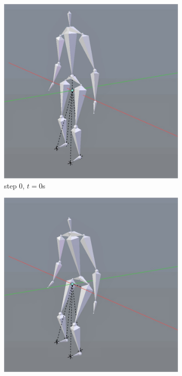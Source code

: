 \documentclass[10pt,twocolumn,letterpaper]{article}
\begin{document}
\begin{figure}
    \centering
    \begin{subfigure}{0.2\textwidth}
        \centering
        \includegraphics[width=.9\linewidth]{sit-0.jpg}
        \caption{step 0, $t=0$s}
    \end{subfigure}\begin{subfigure}{0.2\textwidth}
        \centering
        \includegraphics[width=.9\linewidth]{sit-1.jpg}

\end{subfigure}
\end{figure}
\end{document}
